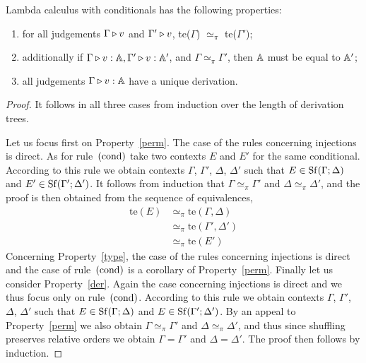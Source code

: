 \documentclass[a4paper,UKenglish,cleveref, autoref, thm-restate]{lipics-v2021}
\begin{document}
\begin{theorem} \label {theorem:unique_der}
   Lambda calculus with conditionals has the following properties:
   \begin{enumerate}
     \item\label{perm} for all judgements $\Gamma \triangleright v$ and $\Gamma'
             \triangleright v$, te($\Gamma$) $\simeq_{\pi}$  te($\Gamma'$); 
     \item\label{type} additionally if $\Gamma \triangleright v: \mathbb{A},
       \Gamma' \triangleright v: \mathbb{A}'$, and $\Gamma \simeq_{\pi}
       \Gamma'$, then $\mathbb{A}$ must be equal to $\mathbb{A}'$;
     \item\label{der} all judgements $\Gamma \triangleright v:\mathbb{A}$ have a unique derivation.
\end{enumerate}
\end{theorem}
%
\begin{proof}
It follows in all three cases from induction over the length of derivation
trees. 

Let us focus first on Property~\eqref{perm}. The case of the rules concerning
injections is direct. As for rule~$(\mathrm{cond})$ take two contexts $E$ and
$E'$ for the same conditional. According to this rule we obtain contexts
$\Gamma$, $\Gamma'$, $\Delta$, $\Delta'$ such that $E \in
\mathrm{Sf}(\Gamma;\Delta)$ and $E' \in \mathrm{Sf}(\Gamma';\Delta')$. It follows from
induction that  $\Gamma \simeq_\pi \Gamma'$ and $\Delta \simeq_\pi \Delta'$,
and the proof is then obtained from the sequence of equivalences,
\begin{align*}
        \text{te}(E) & \simeq_\pi \text{te}(\Gamma, \Delta) 
        \\
        & \simeq_\pi \text{te}(\Gamma', \Delta')
        \\
        & \simeq_\pi \text{te}(E')
\end{align*}
Concerning Property~\eqref{type}, the case of the rules concerning injections
is direct and the case of rule~$(\mathrm{cond})$ is a corollary of
Property~\eqref{perm}. Finally let us consider Property~\eqref{der}. Again the
case concerning injections is direct and we thus focus only on
rule~$(\mathrm{cond})$. According to this rule we obtain contexts $\Gamma$,
$\Gamma'$, $\Delta$, $\Delta'$ such that $E \in \mathrm{Sf}(\Gamma;\Delta)$ and $E
\in \mathrm{Sf}(\Gamma';\Delta')$. By an appeal to Property~\eqref{perm} we also
obtain $\Gamma \simeq_\pi \Gamma'$ and $\Delta \simeq_\pi \Delta'$, and thus
since shuffling preserves relative orders we obtain $\Gamma = \Gamma'$ and
$\Delta = \Delta'$. The proof then follows by induction.
\end{proof}
\end{document}
